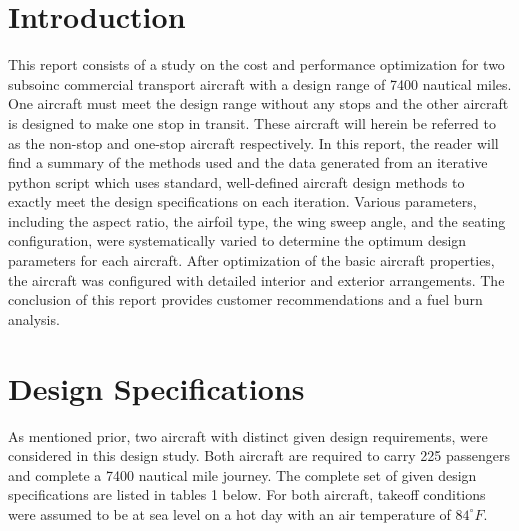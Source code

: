\documentclass{article}
\begin{document}
    \section{Introduction}
    \label{sec:intro}
    \begin{flushleft}
        This report consists of a study on the cost and performance optimization
        for two subsoinc commercial transport aircraft with a design range of
        7400 nautical miles. One aircraft must meet the design range without any
        stops and the other aircraft is designed to make one stop in transit.
        These aircraft will herein be referred to as the non-stop and one-stop
        aircraft respectively. In this report, the reader will find a summary of
        the methods used and the data generated from an iterative python script
        which uses standard, well-defined aircraft design methods to exactly
        meet the design specifications on each iteration. Various parameters,
        including the aspect ratio, the airfoil type, the wing sweep angle, and
        the seating configuration, were systematically varied to determine the
        optimum design parameters for each aircraft. After optimization of the
        basic aircraft properties, the aircraft was configured with detailed
        interior and exterior arrangements. The conclusion of this report
        provides customer recommendations and a fuel burn analysis.
    \end{flushleft}

    \section{Design Specifications}
    \label{sec:specs}
    \begin{flushleft}
        As mentioned prior, two aircraft with distinct given design
        requirements, were considered in this design study. Both aircraft are
        required to carry 225 passengers and complete a 7400 nautical mile
        journey. The complete set of given design specifications are listed in
        tables 1 below. For both aircraft, takeoff conditions were assumed
        to be at sea level on a hot day with an air temperature of
        $84^{\circ}F$.
    \end{flushleft}
\end{document}
